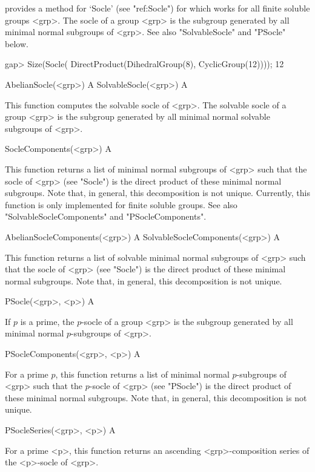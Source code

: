 {\CRISP} provides a method for `Socle' (see "ref:Socle") for which works for 
all finite soluble groups <grp>. The socle of a group <grp> is the subgroup 
generated by all minimal normal subgroups of <grp>. See also "SolvableSocle" and 
"PSocle" below.

\beginexample
gap> Size(Socle( DirectProduct(DihedralGroup(8), CyclicGroup(12))));
12
\endexample

\>AbelianSocle(<grp>) A
\>SolvableSocle(<grp>) A

This function computes the solvable socle of <grp>. The solvable socle of a group <grp> is the
subgroup  generated by all minimal normal solvable subgroups of <grp>.

\>SocleComponents(<grp>) A

This function returns a list of minimal normal subgroups of <grp> such 
that the socle of <grp> (see "Socle") is the direct product of these minimal normal
subgroups. Note that, in general, this decomposition is not unique. Currently,
this function is only implemented for finite soluble groups. See also 
"SolvableSocleComponents" and  "PSocleComponents".

\>AbelianSocleComponents(<grp>) A
\>SolvableSocleComponents(<grp>) A

This function returns a list of solvable minimal normal subgroups of <grp> such 
that the socle of <grp> (see "Socle") is the direct product of these minimal normal
subgroups. Note that, in general, this decomposition is not unique.

\>PSocle(<grp>, <p>) A

If $p$ is a prime, the $p$-socle of a group <grp> is the subgroup 
generated by all minimal normal $p$-subgroups of <grp>.

\>PSocleComponents(<grp>, <p>) A

For a prime $p$, this function returns a list of minimal normal $p$-subgroups of <grp>
such  that the $p$-socle of <grp> (see "PSocle") is the direct product of these minimal normal
subgroups. Note that, in general, this decomposition is not unique.

\>PSocleSeries(<grp>, <p>) A

For a prime <p>, this function returns an ascending <grp>-composition series of the <p>-socle of <grp>.



